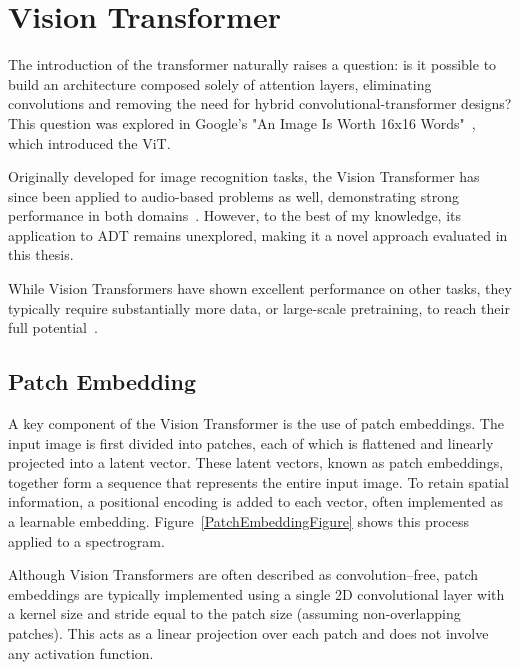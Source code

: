 \section{Vision Transformer}

The introduction of the transformer naturally raises a question: is it possible to build an architecture composed solely of attention layers, eliminating convolutions and removing the need for hybrid convolutional-transformer designs? This question was explored in Google's "An Image Is Worth 16x16 Words"~\cite{dosovitskiy2021imageworth16x16words}, which introduced the \gls{ViT}.

Originally developed for image recognition tasks, the Vision Transformer has since been applied to audio-based problems as well, demonstrating strong performance in both domains~\cite{dosovitskiy2021imageworth16x16words, gong2021astaudiospectrogramtransformer}. However, to the best of my knowledge, its application to \gls{ADT} remains unexplored, making it a novel approach evaluated in this thesis.

While Vision Transformers have shown excellent performance on other tasks, they typically require substantially more data, or large-scale pretraining, to reach their full potential~\cite{dosovitskiy2021imageworth16x16words}.

\subsection{Patch Embedding}

A key component of the Vision Transformer is the use of patch embeddings. The input image is first divided into patches, each of which is flattened and linearly projected into a latent vector. These latent vectors, known as patch embeddings, together form a sequence that represents the entire input image. To retain spatial information, a positional encoding is added to each vector, often implemented as a learnable embedding. Figure~\ref{PatchEmbeddingFigure} shows this process applied to a spectrogram.

Although Vision Transformers are often described as convolution–free, patch embeddings are typically implemented using a single 2D convolutional layer with a kernel size and stride equal to the patch size (assuming non-overlapping patches). This acts as a linear projection over each patch and does not involve any activation function.

